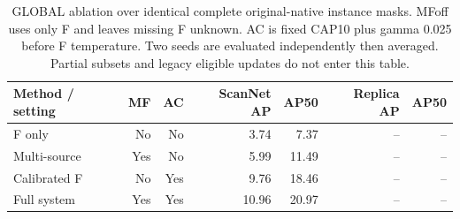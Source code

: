 \begin{table}[t]
\centering
\small
\caption{GLOBAL ablation over identical complete original-native instance masks. MFoff uses only F and leaves missing F unknown. AC is fixed CAP10 plus gamma 0.025 before F temperature. Two seeds are evaluated independently then averaged. Partial subsets and legacy eligible updates do not enter this table.}
\label{tab:benchmark-t2}
\begin{tabular}{lrrrrrr}
\toprule
Method / setting & MF & AC & ScanNet AP & AP50 & Replica AP & AP50 \\
\midrule
F only & No & No & 3.74 & 7.37 & -- & -- \\
Multi-source & Yes & No & 5.99 & 11.49 & -- & -- \\
Calibrated F & No & Yes & 9.76 & 18.46 & -- & -- \\
Full system & Yes & Yes & 10.96 & 20.97 & -- & -- \\
\bottomrule
\end{tabular}
\end{table}
